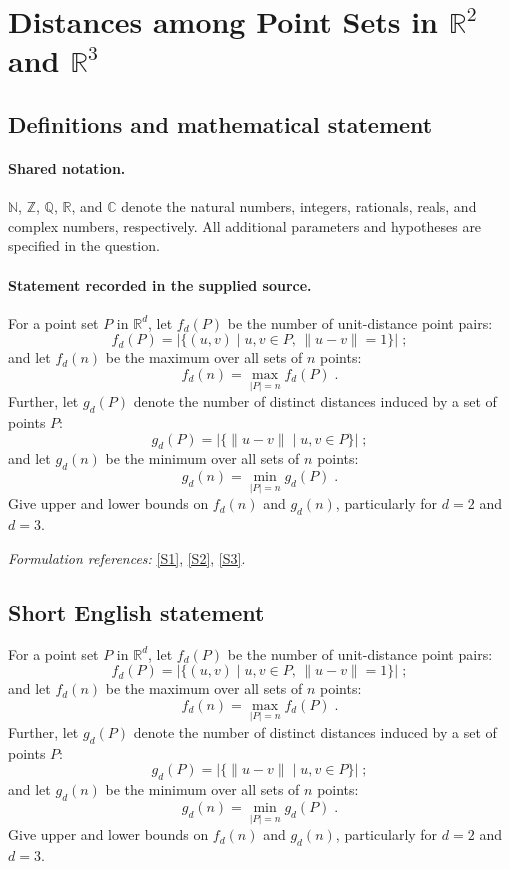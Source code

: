 \documentclass[11pt]{article}
\newcommand{\sref}[2]{\hyperlink{source:#1:#2}{[S#2]}}
\begin{document}
\section{\texorpdfstring{Distances among Point Sets in $\mathbb{R}^2$ and $\mathbb{R}^3$}{Distances among Point Sets in mathbbR\textasciicircum{}2 and mathbbR\textasciicircum{}3}}\label{statement}

\subsection{Definitions and mathematical statement}

\paragraph{Shared notation.}$\mathbb N$, $\mathbb Z$, $\mathbb Q$, $\mathbb R$, and $\mathbb C$ denote the natural numbers, integers, rationals, reals, and complex numbers, respectively. All additional parameters and hypotheses are specified in the question.


\paragraph{Statement recorded in the supplied source.}
For a point set $P$ in $\mathbb{R}^d$, let $f_d(P)$ be the number of unit-distance point pairs: $$f_d(P) = \left| \{ (u,v) \mid u, v \in P, \, \|u-v\| = 1 \} \right| \;;$$ and let $f_d(n)$ be the maximum over all sets of $n$ points: $$f_d(n) = \max_{|P| = n} f_d(P) \;.$$ Further, let $g_d(P)$ denote the number of distinct distances induced by a set of points $P$: $$g_d(P) = \left| \{ \|u-v\| \mid u, v \in P \} \right| \;;$$ and let $g_d(n)$ be the minimum over all sets of $n$ points: $$g_d(n) = \min_{|P|=n} g_d(P) \;.$$ Give upper and lower bounds on $f_d(n)$ and $g_d(n)$, particularly for $d=2$ and $d=3$.
\par\smallskip\textit{Formulation references:} \sref{statement}{1}, \sref{statement}{2}, \sref{statement}{3}.
\subsection{Short English statement}
For a point set $P$ in $\mathbb{R}^d$, let $f_d(P)$ be the number of unit-distance point pairs: $$f_d(P) = \left| \{ (u,v) \mid u, v \in P, \, \|u-v\| = 1 \} \right| \;;$$ and let $f_d(n)$ be the maximum over all sets of $n$ points: $$f_d(n) = \max_{|P| = n} f_d(P) \;.$$ Further, let $g_d(P)$ denote the number of distinct distances induced by a set of points $P$: $$g_d(P) = \left| \{ \|u-v\| \mid u, v \in P \} \right| \;;$$ and let $g_d(n)$ be the minimum over all sets of $n$ points: $$g_d(n) = \min_{|P|=n} g_d(P) \;.$$ Give upper and lower bounds on $f_d(n)$ and $g_d(n)$, particularly for $d=2$ and $d=3$.
\end{document}
